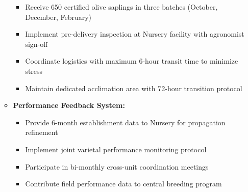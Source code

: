 \begin{itemize}
\begin{itemize}
        \begin{itemize}
            \item Receive 650 certified olive saplings in three batches (October, December, February)
            \item Implement pre-delivery inspection at Nursery facility with agronomist sign-off
            \item Coordinate logistics with maximum 6-hour transit time to minimize stress
            \item Maintain dedicated acclimation area with 72-hour transition protocol
        \end{itemize}
        \item \textbf{Performance Feedback System:}
        \begin{itemize}
            \item Provide 6-month establishment data to Nursery for propagation refinement
            \item Implement joint varietal performance monitoring protocol
            \item Participate in bi-monthly cross-unit coordination meetings
            \item Contribute field performance data to central breeding program
        \end{itemize}
    \end{itemize}
\end{itemize}

